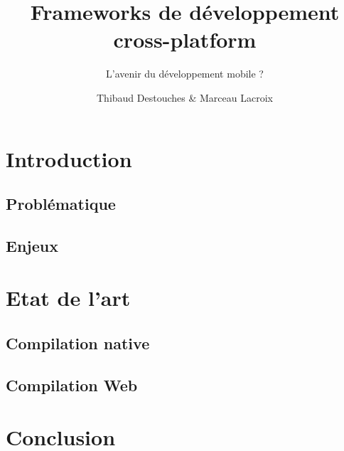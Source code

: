\documentclass{beamer}
\title{Frameworks de développement cross-platform}
\subtitle{L'avenir du développement mobile ?}
\author{Thibaud Destouches \& Marceau Lacroix}
\date{}
\institute{ISTIC -- Université de Rennes 1}
\begin{document}
\begin{frame}[fragile]
\titlepage
\end{frame}

\section{Introduction}
\subsection{Problématique}
\subsection{Enjeux}

\section{Etat de l'art}
\subsection{Compilation native}
\subsection{Compilation Web}

\section{Conclusion}


\begin{frame}
\setcounter{tocdepth}{2}
\tableofcontents
\end{frame}
\end{document}

